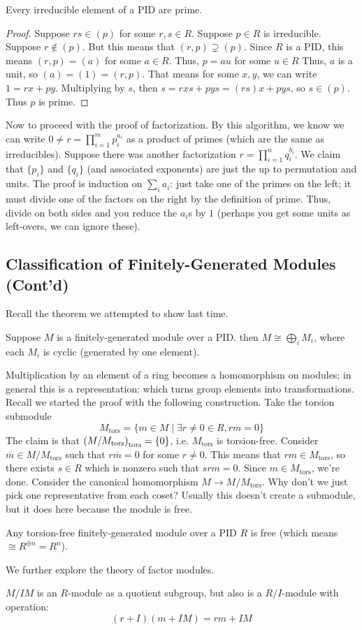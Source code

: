 \begin{theorem}
    Every irreducible element of a PID are prime.
    \begin{proof}
        Suppose $rs \in (p)$ for some $r,s \in R$. Suppose $p\in R$ is irreducible. Suppose $r \notin (p)$. But this means that $(r, p) \supsetneq (p)$.
        Since $R$ is a PID, this means $(r, p) = (a)$ for some $a \in R$. Thus, $p = au$ for some $u \in R$
        Thus, $a$ is a unit, so $(a) = (1) = (r, p)$. That means for some $x, y$, we can write $1 = rx + py$. Multiplying by $s$,
        then $s = rxs + pys = (rs)x + pys$, so $s \in (p)$. Thus $p$ is prime.
    \end{proof}
\end{theorem}
Now to proceed with the proof of factorization. By this algorithm,
we know we can write $0 \neq r = \prod_{i = 1}^m p_i^{a_i}$ as a product of primes (which are the same as irreducibles).
Suppose there was another factorization $r = \prod_{i = 1}^n q_i^{b_i}$. We claim that $\{p_i\}$ and $\{q_i\}$ (and associated exponents)
are just the up to permutation and units. The proof is induction on $\sum_i a_i$: just take one of the primes on the left; it must divide one of the factors on the right
by the definition of prime. Thus, divide on both sides and you reduce the $a_i$s by $1$ (perhaps you get some units as left-overs, we can ignore these).
\subsection{Classification of Finitely-Generated Modules (Cont'd)}
Recall the theorem we attempted to show last time.
\begin{theorem}
    Suppose $M$ is a finitely-generated module over a PID. then $M \cong \bigoplus_i M_i$,
    where each $M_i$ is cyclic (generated by one element).
\end{theorem}
Multiplication by an element of a ring becomes a homomorphism on modules; in general this is a representation: which turns
group elements into transformations. Recall we started the proof with the following construction.
Take the torsion submodule
\[ M_{\text{tors}} = \{m \in M \mid \exists r \neq 0 \in R, rm = 0 \} \]
The claim is that $\qty(M/M_{\text{tors}})_{\text{tors}} = \{0\}$, i.e. $M_{\text{tors}}$ is torsion-free.
Consider $\overline{m} \in M/M_{\text{tors}}$ such that $r \overline{m} = 0$ for some $r \neq 0$.
This means that $rm \in M_{\text{tors}}$, so there exists $s \in R$ which is nonzero such that $srm = 0$.
Since $m \in M_{\text{tors}}$, we're done. Consider the canonical homomorphism $M \to M/M_{\text{tors}}$. Why don't we just pick
one representative from each coset? Usually this doesn't create a submodule, but it does here because the module is free.
\begin{theorem}
Any torsion-free finitely-generated
module over a PID $R$ is free (which means $\cong R^{\oplus n} = R^n$).
\end{theorem}
We further explore the theory of factor modules.
\begin{definition}
    $M/IM$ is an $R$-module as a quotient subgroup, but also is a $R/I$-module with operation:
    \[ (r + I)(m + IM) = rm + IM \]
\end{definition}

